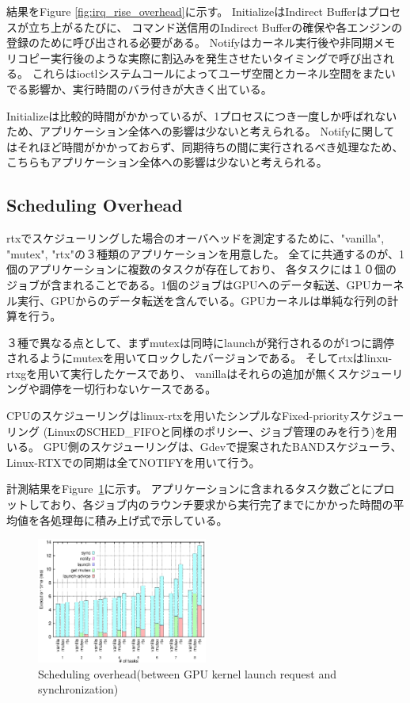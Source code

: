 結果をFigure \ref{fig:irq_rise_overhead}に示す。
InitializeはIndirect Bufferはプロセスが立ち上がるたびに、
コマンド送信用のIndirect Bufferの確保や各エンジンの登録のために呼び出される必要がある。
Notifyはカーネル実行後や非同期メモリコピー実行後のような実際に割込みを発生させたいタイミングで呼び出される。
これらはioctlシステムコールによってユーザ空間とカーネル空間をまたいでる影響か、実行時間のバラ付きが大きく出ている。

Initializeは比較的時間がかかっているが、1プロセスにつき一度しか呼ばれないため、アプリケーション全体への影響は少ないと考えられる。
Notifyに関してはそれほど時間がかかっておらず、同期待ちの間に実行されるべき処理なため、こちらもアプリケーション全体への影響は少ないと考えられる。


\subsection{Scheduling Overhead}\label{sec:eval:sched_overhead}

rtxでスケジューリングした場合のオーバヘッドを測定するために、"vanilla", "mutex", "rtx"の３種類のアプリケーションを用意した。
全てに共通するのが、1個のアプリケーションに複数のタスクが存在しており、
各タスクには１０個のジョブが含まれることである。1個のジョブはGPUへのデータ転送、GPUカーネル実行、GPUからのデータ転送を含んでいる。GPUカーネルは単純な行列の計算を行う。

３種で異なる点として、まずmutexは同時にlaunchが発行されるのが1つに調停されるようにmutexを用いてロックしたバージョンである。
そしてrtxはlinxu-rtxgを用いて実行したケースであり、
vanillaはそれらの追加が無くスケジューリングや調停を一切行わないケースである。

CPUのスケジューリングはlinux-rtxを用いたシンプルなFixed-priorityスケジューリング (LinuxのSCHED\_FIFOと同様のポリシー、ジョブ管理のみを行う)を用いる。
GPU側のスケジューリングは、Gdevで提案されたBANDスケジューラ、Linux-RTXでの同期は全てNOTIFYを用いて行う。

計測結果をFigure~\ref{fig:fp_overhead}に示す。
アプリケーションに含まれるタスク数ごとにプロットしており、各ジョブ内のラウンチ要求から実行完了までにかかった時間の平均値を各処理毎に積み上げ式で示している。


\begin{figure}[t]
\begin{center}
\includegraphics[width=0.5\textwidth]{img/sum_task_fp.eps}
\caption{Scheduling overhead(between GPU kernel launch request and synchronization)}
\end{center}
\label{fig:fp_overhead}
\end{figure}

